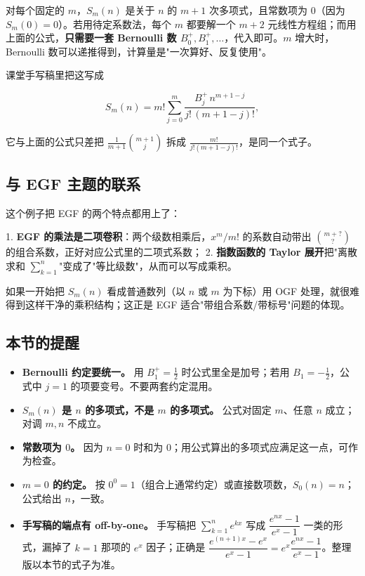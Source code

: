 对每个固定的 $m$，$S_m(n)$ 是关于 $n$ 的 $m+1$ 次多项式，且常数项为 $0$（因为 $S_m(0)=0$）。若用待定系数法，每个 $m$ 都要解一个 $m+2$ 元线性方程组；而用上面的公式，\textbf{只需要一套 Bernoulli 数 $B_0^+,B_1^+,\dots$}，代入即可。$m$ 增大时，Bernoulli 数可以递推得到，计算量是"一次算好、反复使用"。

课堂手写稿里把这写成

\[
S_m(n)=m!\sum_{j=0}^{m}\frac{B_j^+\,n^{m+1-j}}{j!\,(m+1-j)!},
\]

它与上面的公式只差把 $\frac{1}{m+1}\binom{m+1}{j}$ 拆成 $\frac{m!}{j!(m+1-j)!}$，是同一个式子。

\subsection{与 EGF 主题的联系}


这个例子把 EGF 的两个特点都用上了：

1. \textbf{EGF 的乘法是二项卷积}：两个级数相乘后，$x^m/m!$ 的系数自动带出 $\binom{m+?}{?}$ 的组合系数，正好对应公式里的二项式系数；
2. \textbf{指数函数的 Taylor 展开}把"离散求和 $\sum_{k=1}^n$"变成了"等比级数"，从而可以写成乘积。

如果一开始把 $S_m(n)$ 看成普通数列（以 $n$ 或 $m$ 为下标）用 OGF 处理，就很难得到这样干净的乘积结构；这正是 EGF 适合"带组合系数/带标号"问题的体现。

\subsection{本节的提醒}


\begin{itemize}
\item \textbf{Bernoulli 约定要统一。} 用 $B_1^+=\frac12$ 时公式里全是加号；若用 $B_1=-\frac12$，公式中 $j=1$ 的项要变号。不要两套约定混用。
\item \textbf{$S_m(n)$ 是 $n$ 的多项式，不是 $m$ 的多项式。} 公式对固定 $m$、任意 $n$ 成立；对调 $m,n$ 不成立。
\item \textbf{常数项为 $0$。} 因为 $n=0$ 时和为 $0$；用公式算出的多项式应满足这一点，可作为检查。
\item \textbf{$m=0$ 的约定。} 按 $0^0=1$（组合上通常约定）或直接数项数，$S_0(n)=n$；公式给出 $n$，一致。
\item \textbf{手写稿的端点有 off-by-one。} 手写稿把 $\sum_{k=1}^ne^{kx}$ 写成 $\dfrac{e^{nx}-1}{e^x-1}$ 一类的形式，漏掉了 $k=1$ 那项的 $e^x$ 因子；正确是 $\dfrac{e^{(n+1)x}-e^x}{e^x-1}=e^x\dfrac{e^{nx}-1}{e^x-1}$。整理版以本节的式子为准。
\end{itemize}
